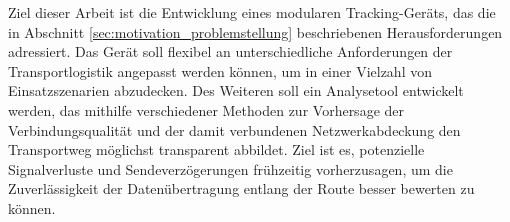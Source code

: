 Ziel dieser Arbeit ist die Entwicklung eines modularen Tracking-Geräts, das die in Abschnitt \ref{sec:motivation_problemstellung} beschriebenen Herausforderungen adressiert.
Das Gerät soll flexibel an unterschiedliche Anforderungen der Transportlogistik angepasst werden können, um in einer Vielzahl von Einsatzszenarien abzudecken.
Des Weiteren soll ein Analysetool entwickelt werden, das mithilfe verschiedener Methoden zur Vorhersage der Verbindungsqualität und der damit verbundenen Netzwerkabdeckung den Transportweg möglichst transparent abbildet.
Ziel ist es, potenzielle Signalverluste und Sendeverzögerungen frühzeitig vorherzusagen, um die Zuverlässigkeit der Datenübertragung entlang der Route besser bewerten zu können.